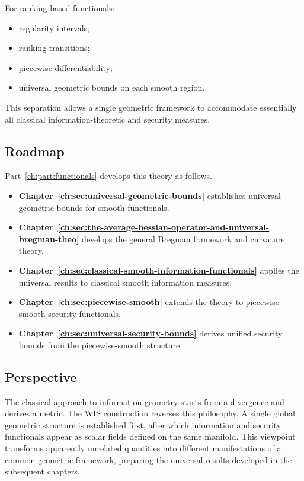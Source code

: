 For ranking-based functionals:
\begin{itemize}
\item regularity intervals;
\item ranking transitions;
\item piecewise differentiability;
\item universal geometric bounds on each smooth region.
\end{itemize}
This separation allows a single geometric framework to accommodate
essentially all classical information-theoretic and security measures.
\subsection{Roadmap}\label{ch:sec:roadmap}
Part~\ref{ch:part:functionals} develops this theory as follows.
\begin{itemize}
\item \textbf{Chapter~\ref{ch:sec:universal-geometric-bounds}} establishes universal geometric bounds for smooth
    functionals.
\item \textbf{Chapter~\ref{ch:sec:the-average-hessian-operator-and-universal-bregman-theo}} develops the general Bregman framework and curvature
    theory.
\item \textbf{Chapter~\ref{ch:sec:classical-smooth-information-functionals}} applies the universal results to classical smooth
    information measures.
\item \textbf{Chapter~\ref{ch:sec:piecewise-smooth}} extends the theory to piecewise-smooth security
    functionals.
\item \textbf{Chapter~\ref{ch:sec:universal-security-bounds}} derives unified security bounds from the
    piecewise-smooth structure.
\end{itemize}
\subsection{Perspective}\label{ch:sec:perspective}
The classical approach to information geometry starts from a divergence
and derives a metric.
The WIS construction reverses this philosophy.
A single global geometric structure is established first, after which
information and security functionals appear as scalar fields defined on
the same manifold.
This viewpoint transforms apparently unrelated quantities into different
manifestations of a common geometric framework, preparing the universal
results developed in the subsequent chapters.

